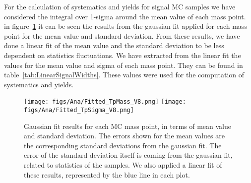 For the calculation of systematics and yields for signal MC samples we have considered the integral over 1-sigma around the mean value of each mass point. in figure~\ref{fig:LinearFitMeanSigma} it can be seen the results from the gaussian fit applied for each mass point for the mean value and standard deviation. From these results, we have done a linear fit of the mean value and the standard deviation to be less dependent on statistics fluctuations. We have extracted from the linear fit the values for the mean value and sigma of each mass point. They can be found in table~\ref{tab:LinearSignalWidths}. These values were used for the computation of systematics and yields.

\begin{figure}[!Hhtbp]
  \begin{center}
    \texttt{[image: figs/Ana/Fitted\_TpMass\_V8.png]}
    \texttt{[image: figs/Ana/Fitted\_TpSigma\_V8.png]}
    \caption{Gaussian fit results for each MC mass point, in terms of mean value and standard deviation. The errors shown for the mean values are the corresponding standard deviations from the gaussian fit. The error of the standard deviation itself is coming from the gaussian fit, related to statistics of the samples. We also applied a linear fit of these results, represented by the blue line in each plot.}
    \label{fig:LinearFitMeanSigma}
  \end{center}
\end{figure}

\begin{table*}[htbH]
\begin{center}
\caption{Mean value and standard deviation from linear fit, from gaussian fit of MC mass points after full selection.\label{tab:LinearSignalWidths}}
\end{center}
\end{table*}

